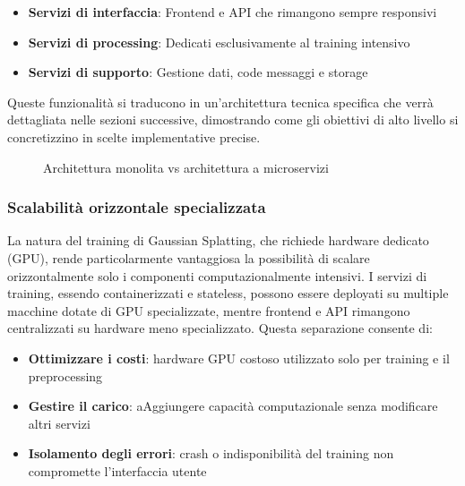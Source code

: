 \begin{itemize}
    \item \textbf{Servizi di interfaccia}: Frontend e API che rimangono sempre responsivi
    \item \textbf{Servizi di processing}: Dedicati esclusivamente al training intensivo
    \item \textbf{Servizi di supporto}: Gestione dati, code messaggi e storage
\end{itemize}


Queste funzionalità si traducono in un'architettura tecnica specifica che verrà dettagliata nelle sezioni successive, dimostrando come gli obiettivi di alto livello si concretizzino in scelte implementative precise.

\begin{figure}[htbp]
	\centering
	\caption{Architettura monolita vs architettura a microservizi}
	\label{fig:monolith_vs_microservices}
\end{figure}

\subsubsection{Scalabilità orizzontale specializzata}
La natura del training di Gaussian Splatting, che richiede hardware dedicato (GPU), rende particolarmente vantaggiosa la possibilità di scalare orizzontalmente solo i componenti computazionalmente intensivi. I servizi di training, essendo containerizzati e stateless, possono essere deployati su multiple macchine dotate di GPU specializzate, mentre frontend e API rimangono centralizzati su hardware meno specializzato.
Questa separazione consente di:

\begin{itemize}
    \item \textbf{Ottimizzare i costi}: hardware GPU costoso utilizzato solo per training e il preprocessing
    \item \textbf{Gestire il carico}: aAggiungere capacità computazionale senza modificare altri servizi
    \item \textbf{Isolamento degli errori}: crash o indisponibilità del training non compromette l'interfaccia utente
\end{itemize}

